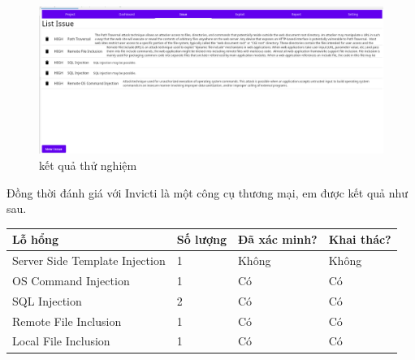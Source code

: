 \documentclass[./../main.tex]{subfiles}
\begin{document}
\begin{figure}[h!]
	\includegraphics[width=\linewidth]{./images/result_test.png}
	\caption{kết quả thử nghiệm}
	\label{fig:result_test}
\end{figure}

Đồng thời đánh giá với Invicti là một công cụ thương mại, em được kết quả như sau.
\begin{table}[H]
	\begin{tabular}{|l|l|l|l|}
		\hline
		\textbf{Lỗ hổng}               & \textbf{Số lượng} & \textbf{Đã xác minh?} & \textbf{Khai thác?} \\ \hline
		Server Side Template Injection & 1                 & Không                 & Không               \\ \hline
		OS Command Injection           & 1                 & Có                    & Có                  \\ \hline
		SQL Injection                  & 2                 & Có                    & Có                  \\ \hline
		Remote File Inclusion          & 1                 & Có                    & Có                  \\ \hline
		Local File Inclusion           & 1                 & Có                    & Có                  \\ \hline
	\end{tabular}
\end{table}
\end{document}
